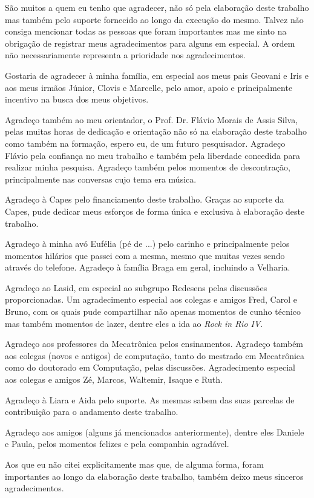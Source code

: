 \acknowledgements
S\~ao muitos a quem eu tenho que agradecer, 
n\~ao s\'o pela elabora\c{c}\~ao deste trabalho mas tamb\'em pelo suporte fornecido ao longo da execu\c{c}\~ao do mesmo. Talvez n\~ao consiga mencionar 
todas as pessoas que foram importantes mas me sinto na obriga\c{c}\~ao de registrar meus agradecimentos para alguns em especial. A ordem n\~ao necessariamente representa a 
prioridade nos agradecimentos.

Gostaria de agradecer \`a minha fam\'ilia, em especial aos meus pais Geovani e Iris e aos meus irm\~aos J\'unior, Clovis e Marcelle, pelo amor, apoio e principalmente incentivo 
na busca dos meus objetivos.

Agrade\c{c}o tamb\'em ao meu orientador, o Prof. Dr. Fl\'avio Morais de Assis Silva, pelas muitas horas de dedica\c{c}\~ao e orienta\c{c}\~ao n\~ao s\'o na elabora\c{c}\~ao deste 
trabalho como tamb\'em na forma\c{c}\~ao, espero eu, de um futuro pesquisador. Agrade\c{c}o Fl\'avio pela confian\c{c}a no meu trabalho e tamb\'em pela 
liberdade concedida para realizar minha pesquisa. Agrade\c{c}o tamb\'em pelos momentos de descontra\c{c}\~ao, principalmente nas conversas cujo tema era m\'usica.

Agrade\c{c}o \`a Capes pelo financiamento deste trabalho. Gra\c{c}as ao suporte da Capes, pude dedicar meus esfor\c{c}os de forma \'unica e exclusiva \`a elabora\c{c}\~ao deste trabalho.

Agrade\c{c}o \`a minha av\'o Euf\'elia (p\'e de ...) pelo carinho e principalmente pelos momentos hil\'arios que passei com a mesma, mesmo que muitas vezes sendo atrav\'es do telefone. 
Agrade\c{c}o \`a fam\'ilia Braga em geral, incluindo a Velharia.

Agrade\c{c}o ao Lasid, em especial ao subgrupo Redesens pelas discuss\~oes proporcionadas. Um agradecimento especial aos colegas e amigos Fred, Carol e Bruno, com os quais 
pude compartilhar n\~ao apenas momentos de cunho t\'ecnico mas tamb\'em momentos de lazer, dentre eles a ida ao \emph{Rock in Rio IV}.

Agrade\c{c}o aos professores da Mecatr\^onica pelos ensinamentos. Agrade\c{c}o tamb\'em aos colegas (novos e antigos) de computa\c{c}\~ao, tanto do mestrado em Mecatr\^onica 
como do doutorado em Computa\c{c}\~ao, pelas discuss\~oes. Agradecimento especial aos colegas e amigos Z\'e, Marcos, Waltemir, Isaque e Ruth.


Agrade\c{c}o \`a Liara e Aida pelo suporte. As mesmas sabem das suas parcelas de contribui\c{c}\~ao para o andamento deste trabalho.

Agrade\c{c}o aos amigos (alguns j\'a mencionados anteriormente), dentre eles Daniele e Paula, pelos momentos felizes e pela companhia agrad\'avel. 

Aos que eu n\~ao citei explicitamente mas que, de alguma forma, foram importantes ao longo da elabora\c{c}\~ao deste trabalho, tamb\'em deixo meus sinceros 
agradecimentos.
